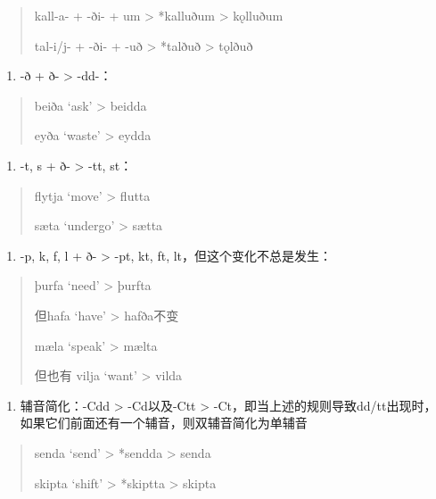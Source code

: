 \begin{quote}
kall-a- + -ði- + um \textgreater{} *kalluðum \textgreater{} kǫlluðum

tal-i/j- + -ði- + -uð \textgreater{} *talðuð \textgreater{} tǫlðuð
\end{quote}

\begin{enumerate}
\def\labelenumi{\arabic{enumi})}
\setcounter{enumi}{2}
\item
  -ð + ð- \textgreater{} -dd-：
\end{enumerate}

\begin{quote}
beiða `ask' \textgreater{} beidda

eyða `waste' \textgreater{} eydda
\end{quote}

\begin{enumerate}
\def\labelenumi{\arabic{enumi})}
\setcounter{enumi}{3}
\item
  -t, s + ð- \textgreater{} -tt, st：
\end{enumerate}

\begin{quote}
flytja `move‌' \textgreater{} flutta

sæta `undergo‌' \textgreater{} sætta
\end{quote}

\begin{enumerate}
\def\labelenumi{\arabic{enumi})}
\setcounter{enumi}{4}
\item
  -p, k, f, l + ð- \textgreater{} -pt, kt, ft,
  lt，但这个变化不总是发生：
\end{enumerate}

\begin{quote}
þurfa `need‌' \textgreater{} þurfta

但hafa `have‌' \textgreater{} hafða不变

mæla `speak‌' \textgreater{} mælta

但也有 vilja `want‌' \textgreater{} vilda
\end{quote}

\begin{enumerate}
\def\labelenumi{\arabic{enumi})}
\setcounter{enumi}{5}
\item
  辅音简化：-Cdd \textgreater{} -Cd以及-Ctt \textgreater{}
  -Ct，即当上述的规则导致dd/tt出现时，如果它们前面还有一个辅音，则双辅音简化为单辅音
\end{enumerate}

\begin{quote}
senda `send‌' \textgreater{} *sendda \textgreater{} senda

skipta `shift‌' \textgreater{} *skiptta \textgreater{} skipta
\end{quote}

